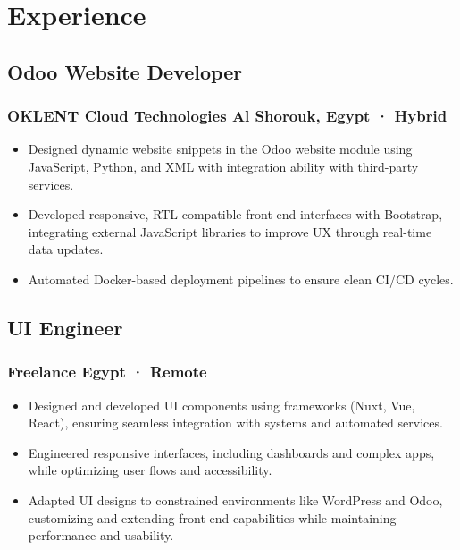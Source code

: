 \section*{Experience}
%
%
%
%
%
%
%
%
\subsection*{
    Odoo Website Developer
    \hspace*{\fill}
}
\subsubsection*{
    OKLENT Cloud Technologies
    \hspace*{\fill}
    \smallFormat Al Shorouk, Egypt · Hybrid
}
\begin{itemize}
    \item Designed dynamic website snippets in the Odoo website module using JavaScript, Python, and XML with integration ability with third-party services.
    \item Developed responsive, RTL-compatible front-end interfaces with Bootstrap, integrating external JavaScript libraries to improve UX through real-time data updates.
    \item Automated Docker-based deployment pipelines to ensure clean CI/CD cycles.
\end{itemize}
%
%
%
%
\subsection*{
    UI Engineer
    \hspace*{\fill}
}
\subsubsection*{
    Freelance
    \hspace*{\fill}
    \smallFormat Egypt · Remote
}
\begin{itemize}
  \item Designed and developed UI components using frameworks (Nuxt, Vue, React), ensuring seamless integration with systems and automated services.
  \item Engineered responsive interfaces, including dashboards and complex apps, while optimizing user flows and accessibility.
  \item Adapted UI designs to constrained environments like WordPress and Odoo, customizing and extending front-end capabilities while maintaining performance and usability.
\end{itemize}
